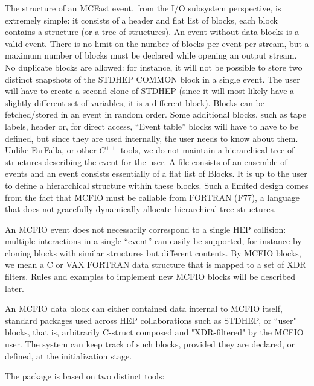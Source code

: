 The structure of an MCFast event, from the I/O subsystem perspective, is
extremely simple: it consists of a header and flat list of blocks, each block
contains  a structure (or a tree of structures). An event without data blocks
is a valid event. There is no limit on the number of blocks per event per
stream, but a maximum number of blocks must be declared while opening an output
stream.    No duplicate blocks are allowed:  for instance, it will not be
possible to store two distinct snapshots of the STDHEP COMMON block in a single
event. The user will have to  create a second clone of STDHEP (since it will
most likely have a slightly different set of variables, it is a different
block).  Blocks can be fetched/stored in an  event in random order. Some
additional blocks, such as tape labels, header or, for direct access, ``Event
table'' blocks will have to have to be defined, but since they are used
internally, the user needs to know about them.  Unlike FarFalla, or other 
$C^{++}$ tools, we do not maintain a hierarchical tree of structures 
describing the event for the user. A file consists of an ensemble of events 
and an event consists essentially of a flat list of Blocks. It is up to the 
user to define a hierarchical structure within these blocks. Such a limited design 
comes from the fact that MCFIO must be callable from FORTRAN (F77), a language
that does not gracefully dynamically allocate hierarchical tree 
structures.

	An MCFIO event does not necessarily correspond to a single HEP 
collision:  multiple interactions in a single ``event'' can easily be 
supported, for instance by cloning blocks with similar structures but 
different contents. By MCFIO blocks, we mean a C or VAX FORTRAN data 
structure that is mapped to a set of XDR filters. Rules and examples to 
implement new MCFIO blocks will be described later. 

	An MCFIO data block can either contained data internal to MCFIO itself, 
standard packages used across HEP collaborations such as STDHEP, or ``user"
blocks, that is, arbitrarily C-struct composed and "XDR-filtered" by the 
MCFIO user. The system can keep track of such blocks, provided they are
declared, or defined, at the initialization stage.   

	The package is based on two distinct tools: 
	
